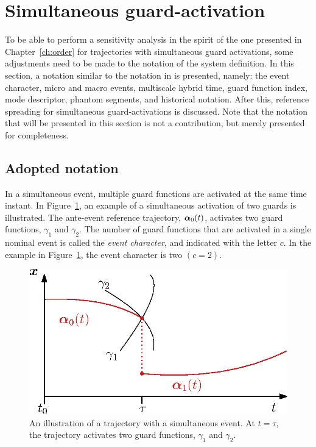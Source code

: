 \documentclass[../DC2017114Bouma.tex]{subfiles}
\begin{document}
\section{Simultaneous guard-activation}\label{sec:simguards}
To be able to perform a sensitivity analysis in the spirit of the one presented in Chapter~\ref{ch:order} for trajectories with simultaneous guard activations, some adjustments need to be made to the notation of the system definition. In this section, a notation similar to the notation in \cite{Rijnen2018} is presented, namely: the event character, micro and macro events, multiscale hybrid time, guard function index, mode descriptor, phantom segments, and historical notation. After this, reference spreading for simultaneous guard-activations is discussed. Note that the notation that will be presented in this section is not a contribution, but merely presented for completeness.

\subsection{Adopted notation}\label{sec:4not}
In a simultaneous event, multiple guard functions are activated at the same time instant. In Figure~\ref{fig:4simulexample}, an example of a simultaneous activation of two guards is illustrated. The ante-event reference trajectory, $\boldsymbol{\alpha}_0(t)$, activates two guard functions, $\gamma_1$ and $\gamma_2$. The number of guard functions that are activated in a single nominal event is called the \textit{event character}, and indicated with the letter $c$. In the example in Figure~\ref{fig:4simulexample}, the event character is two $(c = 2)$.

\begin{figure}[h]
\centering
\includegraphics[width=.45\textwidth]{simulexample.eps}\caption{An illustration of a trajectory with a simultaneous event. At $t=\tau$, the trajectory activates two guard functions, $\gamma_1$ and $\gamma_2$.} \label{fig:4simulexample}
\end{figure}
\end{document}
